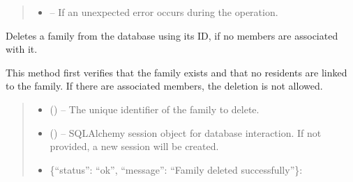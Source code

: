\documentclass[letterpaper,10pt,english]{sphinxmanual}
\begin{document}
\begin{fulllineitems}
\begin{fulllineitems}
\begin{quote}
\begin{description}
\begin{itemize}
\item {} 
\sphinxAtStartPar
{} – If an unexpected error occurs during the operation.

\end{itemize}

\end{description}\end{quote}

\end{fulllineitems}


\begin{fulllineitems}
\label{\detokenize{app.controllers:app.controllers.family_controller.FamilyController.deleteFamily}}
\pysigstartsignatures
\pysiglinewithargsret
{}
{\sphinxparamcomma {}}
{}
\pysigstopsignatures
\sphinxAtStartPar
Deletes a family from the database using its ID, if no members are associated with it.

\sphinxAtStartPar
This method first verifies that the family exists and that no residents are linked
to the family. If there are associated members, the deletion is not allowed.
\begin{quote}\begin{description}
\begin{itemize}
\item {} 
\sphinxAtStartPar
{} () – The unique identifier of the family to delete.

\item {} 
\sphinxAtStartPar
{} (\sphinxstyleliteralemphasis{\sphinxupquote{, }}) – SQLAlchemy session object for database interaction.
If not provided, a new session will be created.

\end{itemize}

\sphinxAtStartPar
\begin{description}
\begin{itemize}
\item {} 
\sphinxAtStartPar
\{“status”: “ok”, “message”: “Family deleted successfully”\}:


\end{itemize}
\end{description}
\end{description}
\end{quote}
\end{fulllineitems}
\end{fulllineitems}
\end{document}
